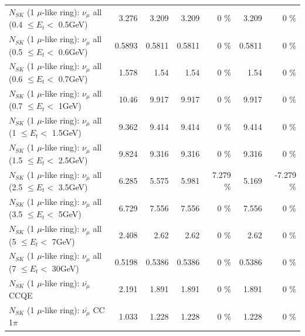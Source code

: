 \begin{table}
\begin{tabular}{| l | r | r | r  r | r  r |}
       $N_{SK}$ (1 $\mu$-like ring): $\nu_{\mu}$ all (0.4 $\leq E_{t} <$ 0.5GeV) &           3.276 &           3.209 &           3.209 &        0 \%  &           3.209 &        0 \%  \\ 
       $N_{SK}$ (1 $\mu$-like ring): $\nu_{\mu}$ all (0.5 $\leq E_{t} <$ 0.6GeV) &          0.5893 &          0.5811 &          0.5811 &        0 \%  &          0.5811 &        0 \%  \\ 
       $N_{SK}$ (1 $\mu$-like ring): $\nu_{\mu}$ all (0.6 $\leq E_{t} <$ 0.7GeV) &           1.578 &            1.54 &            1.54 &        0 \%  &            1.54 &        0 \%  \\ 
         $N_{SK}$ (1 $\mu$-like ring): $\nu_{\mu}$ all (0.7 $\leq E_{t} <$ 1GeV) &           10.46 &           9.917 &           9.917 &        0 \%  &           9.917 &        0 \%  \\ 
         $N_{SK}$ (1 $\mu$-like ring): $\nu_{\mu}$ all (1 $\leq E_{t} <$ 1.5GeV) &           9.362 &           9.414 &           9.414 &        0 \%  &           9.414 &        0 \%  \\ 
       $N_{SK}$ (1 $\mu$-like ring): $\nu_{\mu}$ all (1.5 $\leq E_{t} <$ 2.5GeV) &           9.824 &           9.316 &           9.316 &        0 \%  &           9.316 &        0 \%  \\ 
       $N_{SK}$ (1 $\mu$-like ring): $\nu_{\mu}$ all (2.5 $\leq E_{t} <$ 3.5GeV) &           6.285 &           5.575 &           5.981 &    7.279 \%  &           5.169 &   -7.279 \%  \\ 
         $N_{SK}$ (1 $\mu$-like ring): $\nu_{\mu}$ all (3.5 $\leq E_{t} <$ 5GeV) &           6.729 &           7.556 &           7.556 &        0 \%  &           7.556 &        0 \%  \\ 
           $N_{SK}$ (1 $\mu$-like ring): $\nu_{\mu}$ all (5 $\leq E_{t} <$ 7GeV) &           2.408 &            2.62 &            2.62 &        0 \%  &            2.62 &        0 \%  \\ 
          $N_{SK}$ (1 $\mu$-like ring): $\nu_{\mu}$ all (7 $\leq E_{t} <$ 30GeV) &          0.5198 &          0.5386 &          0.5386 &        0 \%  &          0.5386 &        0 \%  \\ 
\hline
\hline
\hline
                              $N_{SK}$ (1 $\mu$-like ring): $\bar{\nu_\mu}$ CCQE &           2.191 &           1.891 &           1.891 &        0 \%  &           1.891 &        0 \%  \\ 
                         $N_{SK}$ (1 $\mu$-like ring): $\bar{\nu_\mu}$ CC 1$\pi$ &           1.033 &           1.228 &           1.228 &        0 \%  &           1.228 &        0 \%  \\ 

\end{tabular}
\end{table}
